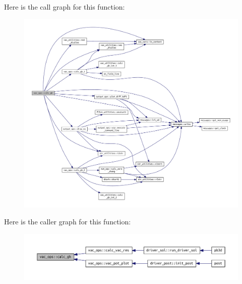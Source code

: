 Here is the call graph for this function\+:\nopagebreak
\begin{figure}[H]
\begin{center}
\leavevmode
\includegraphics[width=350pt]{namespacevac__ops_a7e3f92fbe9fa6cf3de6ac301676b96d1_cgraph}
\end{center}
\end{figure}
Here is the caller graph for this function\+:\nopagebreak
\begin{figure}[H]
\begin{center}
\leavevmode
\includegraphics[width=350pt]{namespacevac__ops_a7e3f92fbe9fa6cf3de6ac301676b96d1_icgraph}
\end{center}
\end{figure}
\mbox{\label{namespacevac__ops_a267742c3c9a1b395aee76527d1e8352c}} 
